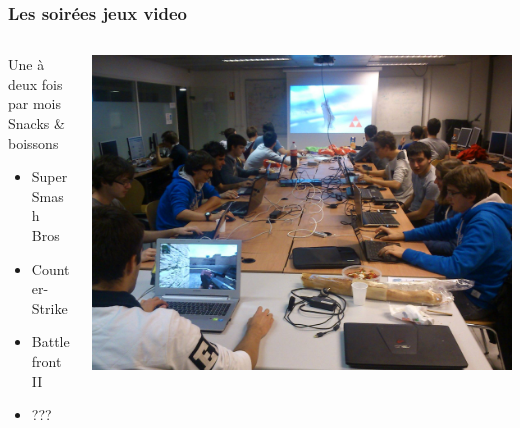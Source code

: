 \documentclass[14pt]{beamer}
\begin{document}
\begin{frame}
    \frametitle{Les soirées jeux video}
    \begin{columns}
        \begin{column}{.5\textwidth}
        Une à deux fois par mois \\
        Snacks \& boissons \\
            \begin{itemize}
                \item Super Smash Bros
                \item Counter-Strike
                \item Battlefront II
                \item ???
            \end{itemize}
        \end{column}
        \begin{column}{.5\textwidth}
        \includegraphics[width=\textwidth]{lan.jpg}
        \end{column}
  \end{columns}
\end{frame}
\end{document}
